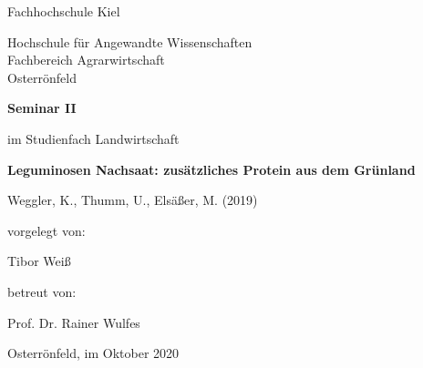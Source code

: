 
\begin{titlepage}
\centering

\begingroup
    \Large{Fachhochschule Kiel}
    \par
\endgroup

\begingroup
    \large{Hochschule für Angewandte Wissenschaften \\
        Fachbereich Agrarwirtschaft \\
        Osterrönfeld}
    \par
\endgroup


\vspace{3cm}


\begingroup
    \Large
    \bfseries{Seminar II}
    \par
\endgroup

\vspace{0.1cm}

im Studienfach Landwirtschaft

\vspace{2cm}

\hrulefill

\vspace{0.5cm}
\begingroup
    \LARGE
    \bfseries{Leguminosen Nachsaat: zusätzliches Protein aus dem Grünland}
    \par
\endgroup
\vspace{0.5cm}
\begingroup
    \small
    Weggler, K., Thumm, U., Elsäßer, M. (2019)
    \par
\endgroup
\vspace{0.2cm}
\hrulefill
\vspace{2cm}

vorgelegt von:

\begingroup
    \large{Tibor Weiß}
    \par
\endgroup

\vspace{2cm}

betreut von:

\begingroup
    \large{Prof. Dr. Rainer Wulfes}
    \par
\endgroup

\vspace{1cm}

Osterrönfeld, im Oktober 2020

\end{titlepage}
